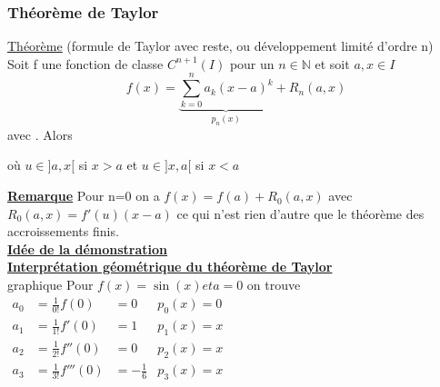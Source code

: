 \documentclass[12pt,a4paper]{article}
\newcommand{\somme}[2]{\ensuremath{\sum\limits_{#2}^{#1}}}
\newcommand{\evid}[1]{\textbf{\underline{#1}}}
\newcommand{\N}{\ensuremath{\mathbb{N}} }
\newcommand{\Theoreme}{\underline{Théorème} }
\begin{document}
{\subsubsection{Théorème de Taylor}
\begin{boite}
	\Theoreme (formule de Taylor avec reste, ou développement limité d'ordre n)\\
	Soit f une fonction de classe $C^{n+1}(I)$ pour un $n \in \N$ et soit $a,x \in I$
	\begin{equation}
		f(x) = \underbrace{\somme{n}{k=0}{a_k(x-a)}^k}_{p_n(x)}+R_n(a,x)
	\end{equation}
	avec . Alors 
	\begin{center}
	\end{center}
	où $u \in ]a,x[$ si $x>a$ et $u\in ]x,a[$ si $x< a$
\end{boite}
\evid{Remarque} Pour n=0 on a $f(x) = f(a) + R_0(a,x)$ avec $R_0(a,x) = f'(u)(x-a)$ ce qui n'est rien d'autre que le théorème des accroissements finis.\\
\evid{Idée de la démonstration}\\
\evid{Interprétation géométrique du théorème de Taylor}\\
{graphique}
Pour $f(x) = \sin(x) et a=0$ on trouve\\
$\begin{array}{lllr}
a_0 & = \frac{1}{0!}f(0) & =0 & p_0(x)=0\\
a_1 & = \frac{1}{1!}f'(0) & =1 & p_1(x)=x\\
a_2 & = \frac{1}{2!}f''(0) & =0 & p_2(x)=x\\
a_3 & = \frac{1}{3!}f'''(0) & =-\frac{1}{6} & p_3(x)=x\\
\end{array}$
}
\end{document}
